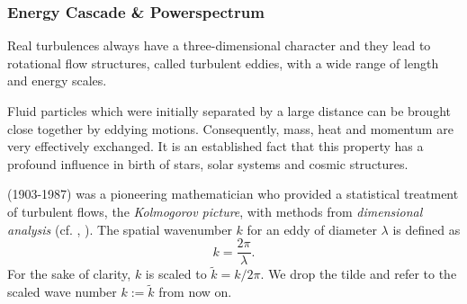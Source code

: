 \subsubsection{Energy Cascade \& Powerspectrum}
\label{sec:theory-powerspectra}
Real turbulences always have a three-dimensional character and they lead to
rotational flow structures, called turbulent eddies, with a wide range of
length and energy scales.

Fluid particles which were initially separated by a large distance can be
brought close together by eddying motions. Consequently, mass, heat and
momentum are very effectively exchanged. It is an established fact that this
property has a profound influence in birth of stars, solar systems and cosmic
structures.

 (1903-1987) was a pioneering mathematician who provided
a statistical treatment of turbulent flows, the \emph{Kolmogorov picture}, with
methods from \emph{dimensional analysis} (cf. \cite[p. 33ff]{yoshizawa2013hydrodynamic},
\cite[p. 26ff]{biskamp2003magnetohydrodynamic}).
The spatial wavenumber $k$ for an eddy of diameter $\lambda$ is defined as
\begin{equation}
\label{eqn:wave-number}
    k = \frac{2\pi}{\lambda}.
\end{equation}
For the sake of clarity, $k$ is scaled to $\tilde{k} = k/2\pi$.  We drop the
tilde and refer to the scaled wave number $k := \tilde{k}$ from now on.

